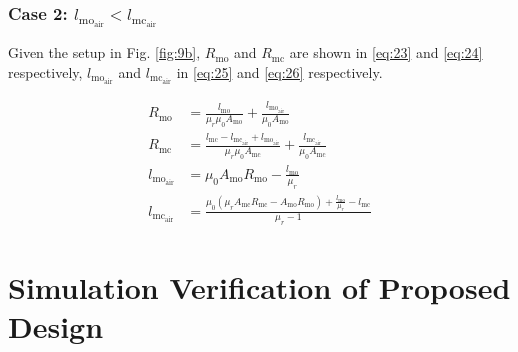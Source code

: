 \documentclass[lettersize,journal]{IEEEtran}
\begin{document}
\subsubsection*{\textup{Case 2: $l_{\mathrm{mo}_{\mathrm{air}}} < l_{\mathrm{mc}_{\mathrm{air}}}$}}
Given the setup in Fig. \ref{fig:9b}, $R_{\mathrm{mo}}$ and $R_{\mathrm{mc}}$ are shown in \eqref{eq:23} and \eqref{eq:24} respectively, $l_{\mathrm{mo}_{\mathrm{air}}}$ and $l_{\mathrm{mc}_{\mathrm{air}}}$ in \eqref{eq:25} and \eqref{eq:26} respectively.

\begin{align}
R_{\mathrm{mo}} &= \frac{l_{\mathrm{mo}}}{\mu_r \mu_0 A_{\mathrm{mo}}} + \frac{l_{\mathrm{mo}_{\mathrm{air}}}}{\mu_0 A_{\mathrm{mo}}} \label{eq:23}\\
R_{\mathrm{mc}} &= \frac{l_{\mathrm{mc}} - l_{\mathrm{mc}_{\mathrm{air}}} + l_{\mathrm{mo}_{\mathrm{air}}}}{\mu_r \mu_0 A_{\mathrm{mc}}} + \frac{l_{\mathrm{mc}_{\mathrm{air}}}}{\mu_0 A_{\mathrm{mc}}} \label{eq:24}\\
l_{\mathrm{mo}_{\mathrm{air}}} &= \mu_0 A_{\mathrm{mo}} R_{\mathrm{mo}} - \frac{l_{\mathrm{mo}}}{\mu_r} \label{eq:25}\\
l_{\mathrm{mc}_{\mathrm{air}}} &= \frac{\mu_0 (\mu_r A_{\mathrm{mc}} R_{\mathrm{mc}} - A_{\mathrm{mo}} R_{\mathrm{mo}}) + \frac{l_{\mathrm{mo}}}{\mu_r} - l_{\mathrm{mc}}}{\mu_r - 1} \label{eq:26}
\end{align}



\section{Simulation Verification of Proposed Design}
\end{document}
